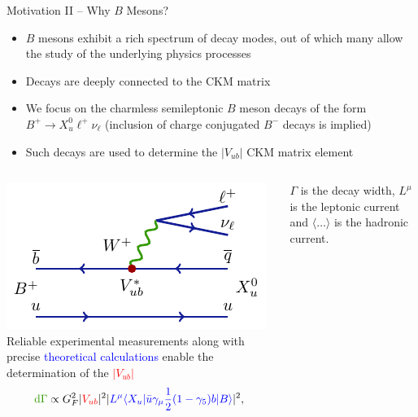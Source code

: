 \documentclass[serif]{beamer}
\begin{document}
\begin{frame}[t]{Motivation II -- Why $B$ Mesons?}
\small
\vspace{-3mm}
\begin{block}{}
	\begin{itemize}
		\item $B$ mesons exhibit a rich spectrum of decay modes, out of which many allow the study of the underlying physics processes
		\item Decays are deeply connected to the CKM matrix
	\end{itemize}
\end{block}

\begin{exampleblock}{}
	\begin{itemize}
		\item We focus on the charmless semileptonic $B$ meson decays of the form $B^+ \to X_u^0 \ell^+ \nu_\ell$ (inclusion of charge conjugated $B^-$ decays is implied)
		\item Such decays are used to determine the $\vert V_{ub}\vert$ CKM matrix element
	\end{itemize}
\end{exampleblock}

\begin{columns}
	\includegraphics[scale=1]{texfig/B2pilnu_short}
	Reliable \textcolor{turtlegreen}{experimental measurements} along with precise \textcolor{blue}{theoretical calculations} enable the determination of the \textcolor{red}{$\vert  V_{ub} \vert$}
	\begin{equation*}
	\textcolor{turtlegreen}{\mathrm{d} \Gamma} \propto G_F^2 \vert \textcolor{red}{ V_{ub}} \vert ^2 \vert \textcolor{blue}{L^\mu \langle X_u \vert \bar u \gamma_\mu \frac{1}{2} (1-\gamma_5) b \vert B \rangle} \vert ^2,
	\end{equation*}
	
$\Gamma$ is the decay width, $L^\mu$ is the leptonic current and $\langle \dots \rangle$ is the hadronic current.
\end{columns}
\end{frame}
\end{document}
